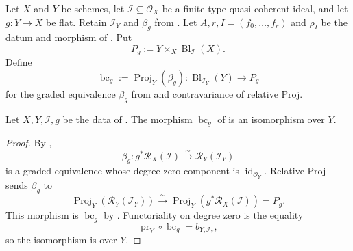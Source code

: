 \begin{definition}
  \label{def:nagata-blowup-flat-base-change-map}
  \lean{}

  Let $X$ and $Y$ be schemes, let
  $\mathcal I\subseteq\mathcal O_X$ be a finite-type quasi-coherent ideal,
  and let $g\colon Y\to X$ be flat.  Retain
  $\mathcal I_Y$ and $\beta_g$ from
  .  
  Let $A,r,I=(f_0,\ldots,f_r)$ and $\rho_I$ be the datum and morphism of
  .  Put
  \[
    P_g:=Y\times_X\operatorname{Bl}_{\mathcal I}(X).
  \]
  Define
  \[
    \operatorname{bc}_g:=\operatorname{Proj}_Y(\beta_g)\colon
    \operatorname{Bl}_{\mathcal I_Y}(Y)
      \longrightarrow
    P_g
  \]
  for the graded equivalence $\beta_g$ from
   and contravariance of relative
  Proj.
\end{definition}

\begin{theorem}
  \label{thm:nagata-blowup-flat-base-change}
  \lean{}

  Let $X,Y,\mathcal I,g$ be the data of
  .  The morphism
  $\operatorname{bc}_g$ of
   is an isomorphism over
  $Y$.
\end{theorem}

\begin{proof}
  By ,
  \[
    \beta_g\colon g^*\mathcal R_X(\mathcal I)
      \xrightarrow{\sim}\mathcal R_Y(\mathcal I_Y)
  \]
  is a graded equivalence whose degree-zero component is
  $\operatorname{id}_{\mathcal O_Y}$.  Relative Proj sends $\beta_g$ to
  \[
    \operatorname{Proj}_Y(\mathcal R_Y(\mathcal I_Y))
      \xrightarrow{\sim}
    \operatorname{Proj}_Y(g^*\mathcal R_X(\mathcal I))
      =P_g.
  \]
  This morphism is $\operatorname{bc}_g$ by
  .  Functoriality on degree zero
  is the equality
  \[
    \operatorname{pr}_Y\circ\operatorname{bc}_g
      =b_{Y,\mathcal I_Y},
  \]
  so the isomorphism is over $Y$.
\end{proof}

